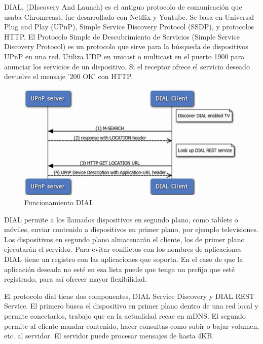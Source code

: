 DIAL, (DIscovery And Launch) es el antiguo protocolo de comunicación que usaba Chromecast, fue desarrollado con Netflix y Youtube.
Se basa en Universal Plug and Play (UPnP), Simple Service Discovery Protocol (SSDP), y protocolos HTTP.
El Protocolo Simple de Descubrimiento de Servicios (Simple Service Discovery Protocol) es un protocolo que sirve para la búsqueda de dispositivos UPnP en una red. Utiliza UDP en unicast o multicast en el puerto 1900 para anunciar los servicios de un dispositivo. Si el receptor ofrece el servicio deseado devuelve el mensaje '200 OK' con HTTP.


\begin{figure}[H]
	\centering
	\includegraphics[scale=0.5]{./Imagenes/dial.png}
	\caption{Funcionamiento DIAL}
	\label{fig:DIAL}
\end{figure}



DIAL permite a los llamados dispositivos en segundo plano, como tablets o móviles, enviar contenido a dispositivos en primer plano, por ejemplo televisiones.
Los dispositivos en segundo plano almacenarán el cliente, los de primer plano ejecutarán el servidor.
Para evitar conflictos con los nombres de aplicaciones DIAL tiene un registro con las aplicaciones que soporta. En el caso de que la aplicación deseada no esté en esa lista puede que tenga un prefijo que esté registrado, para así ofrecer mayor flexibilidad.

El protocolo dial tiene dos componentes, DIAL Service Discovery y DIAL REST Service.
El primero busca el dispositivo en primer plano dentro de una red local y permite conectarlos, trabajo que en la actualidad recae en mDNS.
El segundo permite al cliente mandar contenido, hacer consultas como subir o bajar volumen, etc. al servidor.
El servidor puede procesar mensajes de hasta 4KB.

